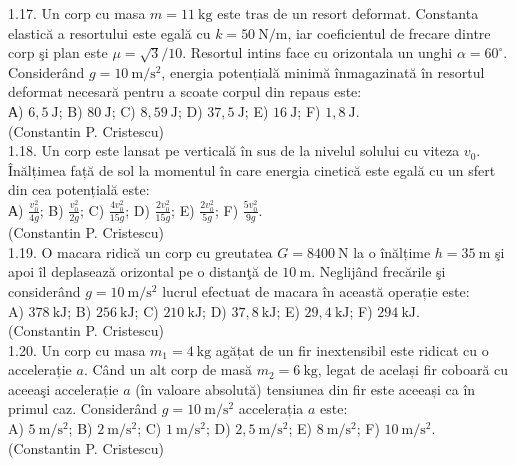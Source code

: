 \documentclass[10pt]{article}
\begin{document}
1.17. Un corp cu masa $m=11 \mathrm{~kg}$ este tras de un resort deformat. Constanta elastică a resortului este egală cu $k=50 \mathrm{~N} / \mathrm{m}$, iar coeficientul de frecare dintre corp şi plan este $\mu=\sqrt{3} / 10$. Resortul intins face cu orizontala un unghi $\alpha=60^{\circ}$. Considerând $g=10 \mathrm{~m} / \mathrm{s}^{2}$, energia potențială minimă înmagazinată în resortul deformat necesară pentru a scoate corpul din repaus este:\\ А) $6,5 \mathrm{~J}$; B) $80 \mathrm{~J}$; C) $8,59 \mathrm{~J}$; D) $37,5 \mathrm{~J}$; E) $16 \mathrm{~J}$; F) $1,8 \mathrm{~J}$.\\ (Constantin P. Cristescu)\\

1.18. Un corp este lansat pe verticală în sus de la nivelul solului cu viteza $v_{0}$. Înălțimea față de sol la momentul în care energia cinetică este egală cu un sfert din cea potențială este:\\ А) $\frac{v_{0}^{2}}{4 g}$; B) $\frac{v_{0}^{2}}{2 g}$; C) $\frac{4 v_{0}^{2}}{15 g}$; D) $\frac{2 v_{0}^{2}}{15 g}$; E) $\frac{2 v_{0}^{2}}{5 g}$; F) $\frac{5 v_{0}^{2}}{9 g}$.\\ (Constantin P. Cristescu)\\

1.19. O macara ridică un corp cu greutatea $G=8400 \mathrm{~N}$ la o înălțime $h=35 \mathrm{~m}$ şi apoi îl deplasează orizontal pe o distanţă de $10 \mathrm{~m}$. Neglijând frecările şi considerând $g=10 \mathrm{~m} / \mathrm{s}^{2}$ lucrul efectuat de macara în această operație este:\\ A) $378 \mathrm{~kJ}$; B) $256 \mathrm{~kJ}$; C) $210 \mathrm{~kJ}$; D) $37,8 \mathrm{~kJ}$; E) $29,4 \mathrm{~kJ}$; F) $294 \mathrm{~kJ}$.\\ (Constantin P. Cristescu)\\

1.20. Un corp cu masa $m_{1}=4 \mathrm{~kg}$ agățat de un fir inextensibil este ridicat cu o accelerație $a$. Când un alt corp de masă $m_{2}=6 \mathrm{~kg}$, legat de același fir coboară cu aceeaşi accelerație $a$ (în valoare absolută) tensiunea din fir este aceeași ca în primul caz. Considerând $g=10 \mathrm{~m} / \mathrm{s}^{2}$ accelerația $a$ este:\\ A) $5 \mathrm{~m} / \mathrm{s}^{2}$; B) $2 \mathrm{~m} / \mathrm{s}^{2}$; C) $1 \mathrm{~m} / \mathrm{s}^{2}$; D) $2,5 \mathrm{~m} / \mathrm{s}^{2}$; E) $8 \mathrm{~m} / \mathrm{s}^{2}$; F) $10 \mathrm{~m} / \mathrm{s}^{2}$.\\ (Constantin P. Cristescu)\\
\end{document}
